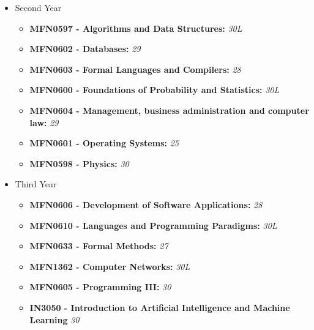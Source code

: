 \documentclass[english, a4paper]{europasscv}
\begin{document}
\begin{europasscv}
{\begin{itemize}
\begin{itemize}
          \item \textbf{MFN0585 - Programming II and Laboratory:} \textit{30L}
        \end{itemize}
        \item Second Year
        \begin{itemize}
          \item \textbf{MFN0597 - Algorithms and Data Structures:} \textit{30L}
          \item \textbf{MFN0602 - Databases:} \textit{29}
          \item \textbf{MFN0603 - Formal Languages and Compilers:} \textit{28}
          \item \textbf{MFN0600 - Foundations of Probability and Statistics:} \textit{30L}
          \item \textbf{MFN0604 - Management, business administration and computer law:} \textit{29}
          \item \textbf{MFN0601 - Operating Systems:} \textit{25}
          \item \textbf{MFN0598 - Physics:} \textit{30}
        \end{itemize}
        \item Third Year
        \begin{itemize}
          \item \textbf{MFN0606 - Development of Software Applications:} \textit{28}
          \item \textbf{MFN0610 - Languages and Programming Paradigms:} \textit{30L}
          \item \textbf{MFN0633 - Formal Methods:} \textit{27}
          \item \textbf{MFN1362 - Computer Networks:} \textit{30L}
          \item \textbf{MFN0605 - Programming III:} \textit{30}
          \item \textbf{IN3050 - Introduction to Artificial Intelligence and Machine Learning} \textit{30}
        \end{itemize}
      \end{itemize}
    }{}

    


    \ecvlanguageheader
    \ecvlanguagefooter


\end{europasscv}
\end{document}
